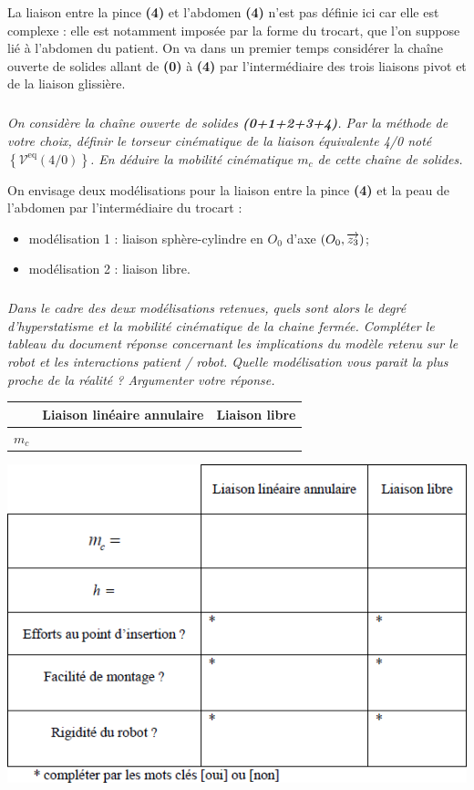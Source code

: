 \documentclass[10pt,fleqn]{article} %
\begin{document}
\begin{multicols}{2}
La liaison entre la pince \textbf{(4)} et l’abdomen \textbf{(4)} n’est pas définie ici car elle est complexe : elle est notamment
imposée par la forme du trocart, que l’on suppose lié à l’abdomen du patient.
On va dans un premier temps considérer la chaîne ouverte de solides allant de \textbf{(0)} à \textbf{(4)} par l’intermédiaire des trois liaisons pivot et de la liaison glissière.

\subparagraph{}\textit{On considère la chaîne ouverte de solides \textbf{(0+1+2+3+4)}. Par la méthode de votre choix, définir le torseur cinématique de la liaison équivalente 4/0 noté $\left\{\mathcal{V}^{\text{eq}}({4}/{0})\right\}$. En déduire la mobilité cinématique $m_c$
de cette chaîne de solides.}

On envisage deux modélisations pour la liaison entre la pince \textbf{(4)} et la peau de l’abdomen par l’intermédiaire du trocart :
\begin{itemize}
\item modélisation 1 : liaison sphère-cylindre en $O_0$ d’axe $\left(O_0,\overrightarrow{z_3}\right)$;
\item modélisation 2 : liaison libre.
\end{itemize}


\subparagraph{}\textit{Dans le cadre des deux modélisations retenues, quels sont alors le degré d’hyperstatisme et la mobilité cinématique de la chaine fermée. Compléter le tableau du document réponse concernant les
implications du modèle retenu sur le robot et les interactions patient / robot. Quelle modélisation vous
parait la plus proche de la réalité ? Argumenter votre réponse.}
\begin{center}
\begin{tabular}{ccc}
\hline
& Liaison linéaire annulaire & Liaison libre  \\
\hline
$m_c$ & & \\ \hline
\end{tabular}
\end{center}
\begin{center}
\includegraphics[width=\linewidth]{images/fig_11}
\end{center}


\end{multicols}
\end{document}
